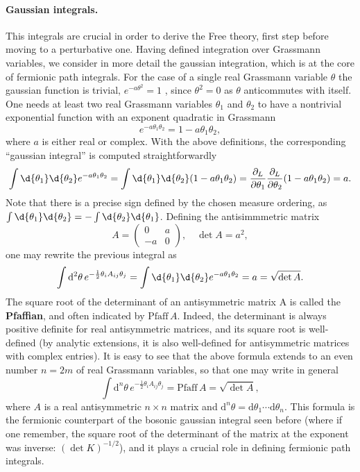 \paragraph{Gaussian integrals.}
This integrals are crucial in order to derive the Free theory, first step before moving to a perturbative one. Having defined integration over Grassmann variables, we consider in more detail the gaussian integration, which is at the core of fermionic path integrals. For the case of a single real Grassmann variable \(\theta\) the gaussian function is trivial, \(e^{-a \theta^2} = 1\) , since \(\theta^2=0\) as \(\theta\) anticommutes with itself. One needs at least two real Grassmann variables \(\theta_1\) and \(\theta_2\) to have a nontrivial exponential function with an exponent quadratic in Grassmann
\[
    e^{-a \theta_1 \theta_2} = 1 - a \theta_1 \theta_2,
\]
where \(a\) is either real or complex. With the above definitions, the corresponding “gaussian integral” is computed straightforwardly
\[
    \int \d{\theta_1} \d{\theta_2} e^{-a \theta_1 \theta_2} = \int \d{\theta_1} \d{\theta_2} (1 - a \theta_1 \theta_2) = \frac{\partial_L}{\partial \theta_1} \frac{\partial_L}{\partial \theta_2} (1 - a \theta_1 \theta_2) = a.
\]
Note that there is a precise sign defined by the chosen measure ordering, as \(\int \d{\theta_1} \d{\theta_2} = - \int \d{\theta_2} \d{\theta_1}\). Defining the antisimmmetric matrix
\[
    A = \begin{pmatrix}
        0  & a \\
        -a & 0
    \end{pmatrix}, \quad \det A = a^2,
\]
one may rewrite the previous integral as
\[
    \int \mathrm{d}^2 \theta \, e^{-\frac{1}{2} \theta_i A_{ij} \theta_j} = \int \d{\theta_1} \d{\theta_2} e^{-a \theta_1 \theta_2} = a = \sqrt{\det A}.
\]
The square root of the determinant of an antisymmetric matrix A is called the \textbf{Pfaffian}, and often indicated by \(\text{Pfaff}\, A\). Indeed, the determinant is always positive definite for real antisymmetric matrices, and its square root is well-defined (by analytic extensions, it is also well-defined for antisymmetric matrices with complex entries). It is easy to see that the above formula extends to an even number \(n = 2m\) of real Grassmann variables, so that one may write in general
\[
    \int \mathrm{d}^n \theta \, e^{-\frac{1}{2} \theta_i A_{ij} \theta_j} = \text{Pfaff}\, A = \sqrt{\det A},
\]
where \(A\) is a real antisymmetric \(n \times n\) matrix and \(\mathrm{d}^n \theta = \mathrm{d} \theta_1 \cdots \mathrm{d} \theta_n\). This formula is the fermionic counterpart of the bosonic gaussian integral seen before (where if one remember, the square root of the determinant of the matrix at the exponent was inverse: \((\det K)^{-1 / 2}\)), and it plays a crucial role in defining fermionic path integrals.
